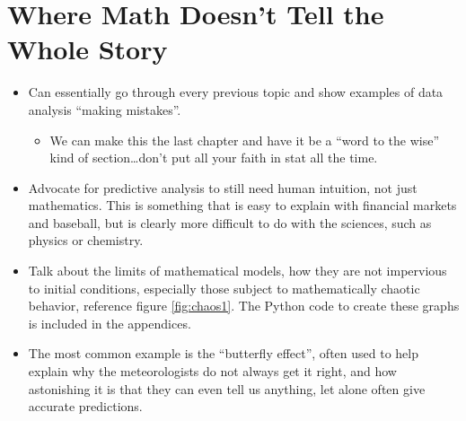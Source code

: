 \documentclass[../../fulltext/fulltext.tex]{subfiles}
\begin{document}
\chapter[When the Numbers Lie]{Where Math Doesn't Tell the Whole Story}
\begin{itemize}
	\item Can essentially go through every previous topic and show examples of data analysis ``making mistakes''.
		\begin{itemize}
			\item We can make this the last chapter and have it be a \enquote{word to the wise} kind of section\ldots don't put all your faith in stat all the time.
		\end{itemize}
	\item Advocate for predictive analysis to still need human intuition, not just mathematics.  This is something that is easy to explain with financial markets and baseball, but is clearly more difficult to do with the sciences, such as physics or chemistry.
	\item Talk about the limits of mathematical models, how they are not impervious to initial conditions, especially those subject to mathematically chaotic behavior, reference figure \ref{fig:chaos1}. The Python code to create these graphs is included in the appendices.
	\item The most common example is the \enquote{butterfly effect}, often used to help explain why the meteorologists do not always get it right, and how astonishing it is that they can even tell us anything, let alone often give accurate predictions.
\end{itemize}
\end{document}
